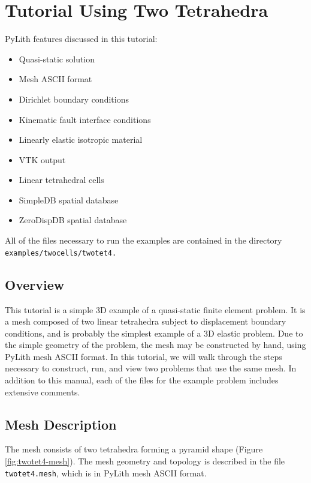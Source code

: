 
\section{\label{sec:Tutorial-Two-tet4}Tutorial Using Two Tetrahedra}

PyLith features discussed in this tutorial:
\begin{itemize}
\item Quasi-static solution
\item Mesh ASCII format
\item Dirichlet boundary conditions
\item Kinematic fault interface conditions
\item Linearly elastic isotropic material
\item VTK output
\item Linear tetrahedral cells
\item SimpleDB spatial database
\item ZeroDispDB spatial database
\end{itemize}
All of the files necessary to run the examples are contained in the
directory \texttt{examples/twocells/twotet4.}


\subsection{Overview}

This tutorial is a simple 3D example of a quasi-static finite element
problem. It is a mesh composed of two linear tetrahedra subject to
displacement boundary conditions, and is probably the simplest example
of a 3D elastic problem. Due to the simple geometry of the problem,
the mesh may be constructed by hand, using PyLith mesh ASCII format.
In this tutorial, we will walk through the steps necessary to construct,
run, and view two problems that use the same mesh. In addition to
this manual, each of the files for the example problem includes extensive
comments.


\subsection{Mesh Description}

The mesh consists of two tetrahedra forming a pyramid shape (Figure
\ref{fig:twotet4-mesh}). The mesh geometry and topology is described
in the file \texttt{twotet4.mesh}, which is in PyLith mesh ASCII format.

